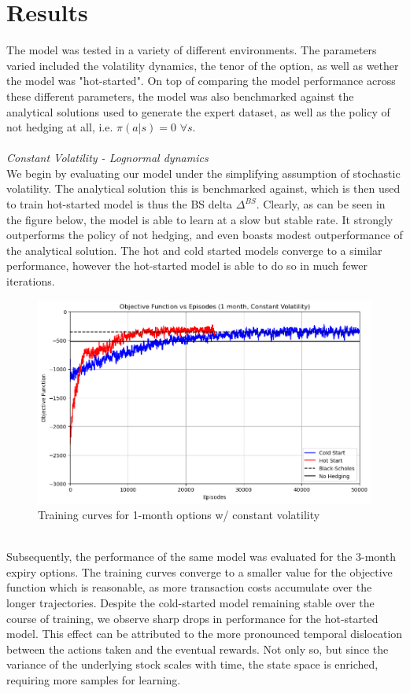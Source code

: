 \documentclass{article}
\begin{document}
\section{Results}
The model was tested in a variety of different environments. The parameters varied included the volatility dynamics, the tenor of the option, as well as wether the model was "hot-started". On top of comparing the model performance across these different parameters, the model was also benchmarked against the analytical solutions used to generate the expert dataset, as well as the policy of not hedging at all, i.e. $\pi(a|s) = 0$  $\forall s$.\\\\
\textit{Constant Volatility - Lognormal dynamics}\\
We begin by evaluating our model under the simplifying assumption of stochastic volatility. The analytical solution this is benchmarked against, which is then used to train hot-started model is thus the BS delta $\Delta^{BS}$. Clearly, as can be seen in the figure below, the model is able to learn at a slow but stable rate. It strongly outperforms the policy of not hedging, and even boasts modest outperformance of the analytical solution. The hot and cold started models converge to a similar performance, however the hot-started model is able to do so in much fewer iterations.\\
\begin{figure}[h!]
    \centering
    \includegraphics[width=.9\linewidth]{figures/1m_const.png}
    \caption{Training curves for 1-month options w/ constant volatility}
    \label{fig:1m_const}
\end{figure}\\
Subsequently, the performance of the same model was evaluated for the 3-month expiry options. The training curves converge to a smaller value for the objective function which is reasonable, as more transaction costs accumulate over the longer trajectories. Despite the cold-started model remaining stable over the course of training, we observe sharp drops in performance for the hot-started model. This effect can be attributed to the more pronounced temporal dislocation between the actions taken and the eventual rewards. Not only so, but since the variance of the underlying stock scales with time, the state space is enriched, requiring more samples for learning.\\
\end{document}
